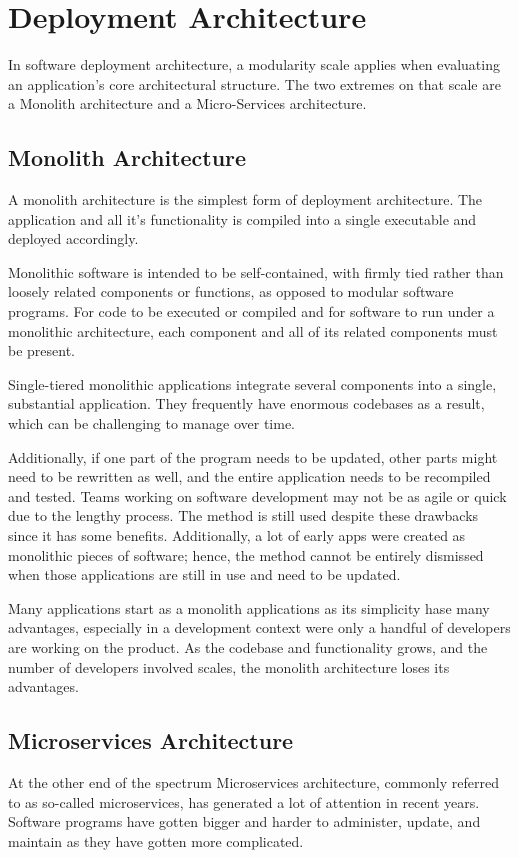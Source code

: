 \section{Deployment Architecture}
\label{sec:deploymentarchitecture}
In software deployment architecture, a modularity scale applies when evaluating an application's core architectural structure. The two extremes on that scale are a Monolith architecture and a Micro-Services architecture.
\subsection{Monolith Architecture}
A monolith architecture is the simplest form of deployment architecture. The application and all it's functionality is compiled into a single executable and deployed accordingly. 

Monolithic software is intended to be self-contained, with firmly tied rather than loosely related components or functions, as opposed to modular software programs. For code to be executed or compiled and for software to run under a monolithic architecture, each component and all of its related components must be present.

Single-tiered monolithic applications integrate several components into a single, substantial application. They frequently have enormous codebases as a result, which can be challenging to manage over time.

Additionally, if one part of the program needs to be updated, other parts might need to be rewritten as well, and the entire application needs to be recompiled and tested. Teams working on software development may not be as agile or quick due to the lengthy process. The method is still used despite these drawbacks since it has some benefits. Additionally, a lot of early apps were created as monolithic pieces of software; hence, the method cannot be entirely dismissed when those applications are still in use and need to be updated.

Many applications start as a monolith applications as its simplicity hase many advantages, especially in a development context were only a handful of developers are working on the product. As the codebase and functionality grows, and the number of developers involved scales, the monolith architecture loses its advantages.
\subsection{Microservices Architecture}
At the other end of the spectrum Microservices architecture, commonly referred to as so-called microservices, has generated a lot of attention in recent years. Software programs have gotten bigger and harder to administer, update, and maintain as they have gotten more complicated.

